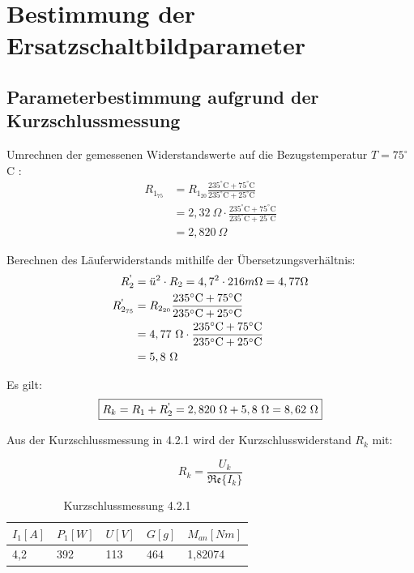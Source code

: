 \documentclass[conference]{IEEEtran}
\begin{document}
\section{Bestimmung der Ersatzschaltbildparameter}
\subsection{Parameterbestimmung aufgrund der Kurzschlussmessung}

Umrechnen der gemessenen Widerstandswerte auf die Bezugstemperatur $T=75^\circ$C :
\begin{align*}
    R_{1_{75}} & = R_{1_{20}}\frac{235^\circ\text{C}+75^\circ\text{C}}{235^\circ\text{C}+25^\circ\text{C}}         \\
               & = 2,32\ \Omega\cdot \frac{235^\circ\text{C}+75^\circ\text{C}}{235^\circ\text{C}+25^\circ\text{C}} \\
               & = 2,820\ \Omega
\end{align*}

Berechnen des Läuferwiderstands mithilfe der Übersetzungsverhältnis:
\begin{align*}
    R_2^\text{\textquotesingle}        & = \ddot{u}^2\cdot R_2 = 4,7^2 \cdot 216m\Omega   = 4,77 \Omega                                    \\
    R_{2_{75}}^\text{\textquotesingle} & = R_{2_{20}}\frac{235^\circ\text{C}+75^\circ\text{C}}{235^\circ\text{C}+25^\circ\text{C}}         \\
                                       & = 4,77\ \Omega\cdot \frac{235^\circ\text{C}+75^\circ\text{C}}{235^\circ\text{C}+25^\circ\text{C}} \\
                                       & = 5,8\ \Omega
\end{align*}

Es gilt:
\begin{equation} \label{eq:Kurzschlusswiderstand_gemessen}
    \boxed{R_k = R_1 + R_2^\text{\textquotesingle} = 2,820\ \Omega + 5,8\ \Omega = 8,62\ \Omega}
\end{equation}

Aus der Kurzschlussmessung in 4.2.1 wird der Kurzschlusswiderstand $R_k$ mit:

\begin{equation}
    \boxed{R_k = \frac{U_k}{\mathfrak{Re}\{I_k\}}}
\end{equation}

\begin{table}[htbp]
    \begin{tabularx}{\columnwidth}{XXXXX}
        \toprule
        $I_1[A]$ & $P_1[W]$ & $U[V]$ & $G[g]$ & $M_{an}[Nm]$ \\
        \midrule
        4,2      & 392      & 113    & 464    & 1,82074      \\
        \bottomrule
    \end{tabularx}
    \caption{Kurzschlussmessung 4.2.1}
    \label{tab:Kurzschlussmessung}
\end{table}
\end{document}
